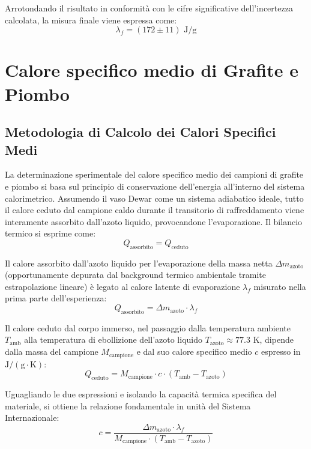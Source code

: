\documentclass[a4paper,12pt]{article}
\begin{document}
Arrotondando il risultato in conformità con le cifre significative dell'incertezza calcolata, la misura finale viene espressa come:
\begin{equation*}
\lambda_f = (172 \pm 11)\text{ J/g}
\end{equation*}
\section{Calore specifico medio di Grafite e Piombo}
\subsection{Metodologia di Calcolo dei Calori Specifici Medi}
La determinazione sperimentale del calore specifico medio dei campioni di grafite e piombo si basa sul principio di conservazione dell'energia all'interno del sistema calorimetrico. Assumendo il vaso Dewar come un sistema adiabatico ideale, tutto il calore ceduto dal campione caldo durante il transitorio di raffreddamento viene interamente assorbito dall'azoto liquido, provocandone l'evaporazione. Il bilancio termico si esprime come:
\begin{equation*}
    Q_{\text{assorbito}} = Q_{\text{ceduto}}
\end{equation*}

Il calore assorbito dall'azoto liquido per l'evaporazione della massa netta $\Delta m_{\text{azoto}}$ (opportunamente depurata dal background termico ambientale tramite estrapolazione lineare) è legato al calore latente di evaporazione $\lambda_f$ misurato nella prima parte dell'esperienza:
\begin{equation*}
    Q_{\text{assorbito}} = \Delta m_{\text{azoto}} \cdot \lambda_f
\end{equation*}

Il calore ceduto dal corpo immerso, nel passaggio dalla temperatura ambiente $T_{\text{amb}}$ alla temperatura di ebollizione dell'azoto liquido $T_{\text{azoto}} \approx 77.3\text{ K}$, dipende dalla massa del campione $M_{\text{campione}}$ e dal suo calore specifico medio $c$ espresso in $\text{J}/(\text{g}\cdot\text{K})$:
\begin{equation*}
    Q_{\text{ceduto}} = M_{\text{campione}} \cdot c \cdot (T_{\text{amb}} - T_{\text{azoto}})
\end{equation*}

Uguagliando le due espressioni e isolando la capacità termica specifica del materiale, si ottiene la relazione fondamentale in unità del Sistema Internazionale:
\begin{equation*}
    c = \frac{\Delta m_{\text{azoto}} \cdot \lambda_f}{M_{\text{campione}} \cdot (T_{\text{amb}} - T_{\text{azoto}})}
\end{equation*}
\end{document}
